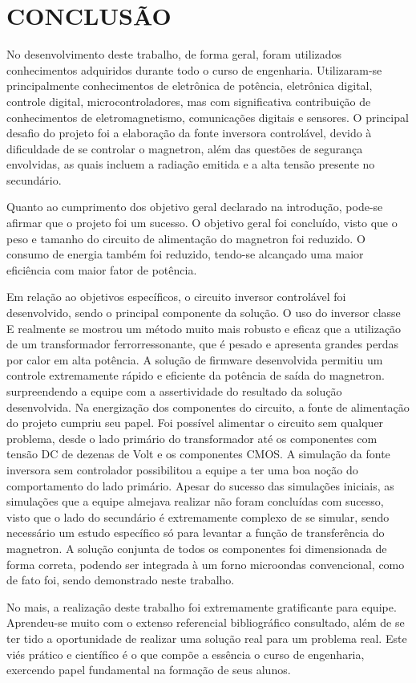 \chapter{CONCLUSÃO}
\label{chap:conclusao}


No desenvolvimento deste trabalho, de forma geral, foram utilizados conhecimentos adquiridos durante todo o curso de engenharia. Utilizaram-se principalmente conhecimentos de eletrônica de potência, eletrônica digital, controle digital, microcontroladores, mas com significativa contribuição de conhecimentos de eletromagnetismo, comunicações digitais e  sensores. O principal desafio do projeto foi a elaboração da fonte inversora controlável, devido à dificuldade de se controlar o magnetron, além das questões de segurança envolvidas, as quais incluem a radiação emitida e a alta tensão presente no secundário.

Quanto ao cumprimento dos objetivo geral declarado na introdução, pode-se afirmar que o projeto foi um sucesso. O objetivo geral foi concluído, visto que o peso e tamanho do circuito de alimentação do magnetron foi reduzido. O consumo de energia também foi reduzido, tendo-se alcançado uma maior eficiência com maior fator de potência. 

Em relação ao objetivos específicos, o circuito inversor controlável foi desenvolvido, sendo o principal componente da solução. O uso do inversor classe E realmente se mostrou um método muito mais robusto e eficaz que a utilização de um transformador ferrorressonante, que é pesado e apresenta grandes perdas por calor em alta potência. A solução de firmware desenvolvida  permitiu um controle extremamente rápido e eficiente da potência de saída do magnetron. surpreendendo a equipe com a assertividade do resultado da solução desenvolvida. Na energização dos componentes do circuito, a fonte de alimentação do projeto cumpriu seu papel. Foi possível alimentar o circuito sem qualquer problema, desde o lado primário do transformador até os componentes com tensão DC de dezenas de Volt e os componentes CMOS. A simulação da fonte inversora sem controlador possibilitou a equipe a ter uma boa noção do comportamento do lado primário. Apesar do sucesso das simulações iniciais, as simulações que a equipe almejava realizar não foram concluídas com sucesso, visto que o lado do secundário é extremamente complexo de se simular, sendo necessário um estudo específico só para levantar a função de transferência do magnetron. A solução conjunta de todos os componentes foi dimensionada de forma correta, podendo ser integrada à um forno microondas convencional, como de fato foi, sendo demonstrado neste trabalho.

No mais, a realização deste trabalho foi extremamente gratificante para equipe. Aprendeu-se muito com o extenso referencial bibliográfico consultado, além de se ter tido a oportunidade de realizar uma solução real para um problema real. Este viés prático e científico é o que compõe a essência o curso de engenharia, exercendo papel fundamental na formação de seus alunos.